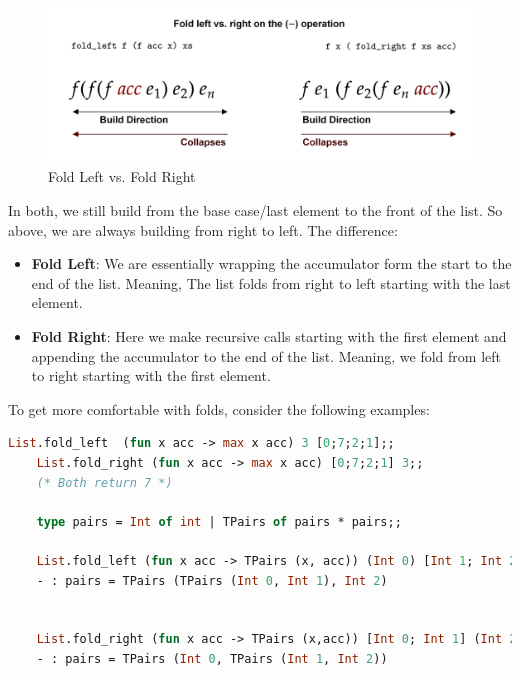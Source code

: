 \begin{figure}[h]
    
    \hspace{-.5em}
    \includegraphics[width=1\textwidth]{Sections/order/fold.png}
    \caption{Fold Left vs. Fold Right}
\end{figure}

\noindent
In both, we still build from the base case/last element to the front of the list. So above, we are always building from right to left.
The difference: 

\begin{itemize}
    \item \textbf{Fold Left}: We are essentially wrapping the accumulator form the start to the end of the list. Meaning,
    The list folds from right to left starting with the last element.
    \item \textbf{Fold Right}: Here we make recursive calls starting with the first element and appending the accumulator to the end of the list. Meaning,
    we fold from left to right starting with the first element.
\end{itemize}

\begin{Example}

    To get more comfortable with folds, consider the following examples:

    \begin{lstlisting}[language=OCaml, numbers=none]
    List.fold_left  (fun x acc -> max x acc) 3 [0;7;2;1];;
    List.fold_right (fun x acc -> max x acc) [0;7;2;1] 3;;
    (* Both return 7 *)

    type pairs = Int of int | TPairs of pairs * pairs;;

    List.fold_left (fun x acc -> TPairs (x, acc)) (Int 0) [Int 1; Int 2];;
    - : pairs = TPairs (TPairs (Int 0, Int 1), Int 2)


    List.fold_right (fun x acc -> TPairs (x,acc)) [Int 0; Int 1] (Int 2);;
    - : pairs = TPairs (Int 0, TPairs (Int 1, Int 2))
    \end{lstlisting}
\end{Example}




